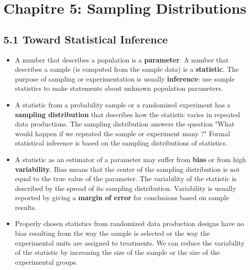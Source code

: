 \section{Chapitre 5: Sampling Distributions}
	\subsection{5.1 Toward Statistical Inference}
		\begin{itemize}
			\item A number that describes a population is a \textbf{parameter}. A number that describes a sample (is computed from the sample data) is a \textbf{statistic}. The purpose of sampling or experimentation is usually \textbf{inference}: use sample statistics to make statements about unknown population parameters.
			
			\item  A statistic from a probability sample or a randomized experiment has a \textbf{sampling distribution} that describes how the statistic varies in repeated data productions. The sampling distribution answers the question "What would happen if we repeated the sample or experiment many ?" Formal statistical inference is based on the sampling distributions of statistics.
			
			\item  A statistic as an estimator of a parameter may suffer from \textbf{bias} or from high \textbf{variability}. Bias means that the center of the sampling distribution is not equal to the true value of the parameter. The variability of the statistic is described by the spread of its sampling distribution. Variability is usually reported by giving a \textbf{margin of error} for conclusions based on sample results.
			
			\item  Properly chosen statistics from randomized data production designs have no bias resulting from the way the sample is selected or the way the experimental units are assigned to treatments. We can reduce the variability of the statistic by increasing the size of the sample or the size of the experimental groups.
		\end{itemize}
